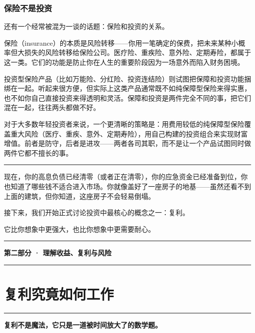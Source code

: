 \documentclass[a4paper,11pt,oneside,fontset=none,UTF8,zihao=-4]{ctexbook}
\newcommand{\partdivider}[1]{%
  \clearpage
  \thispagestyle{empty}%
  \vspace*{5.0cm}%
  \begin{center}%
    {\color{dh-blossom}\rule{0.35\textwidth}{1.5pt}\par}%
    \vspace{1.2cm}%
    {\Huge\bfseries\sffamily\color{dh-navy} #1\par}%
    \vspace{1.2cm}%
    {\color{dh-blossom}\rule{0.35\textwidth}{1.5pt}\par}%
  \end{center}%
  \vfill
  \clearpage
}
\begin{document}
\subsection{保险不是投资}\label{ux4fddux9669ux4e0dux662fux6295ux8d44}

还有一个经常被混为一谈的话题：保险和投资的关系。

保险（insurance）的本质是风险转移------你用一笔确定的保费，把未来某种小概率但大损失的风险转移给保险公司。医疗险、重疾险、意外险、定期寿险，都属于这一类。它们的功能是防止你在人生的重要阶段因为一场意外而陷入财务困境。

投资型保险产品（比如万能险、分红险、投资连结险）则试图把保障和投资功能捆绑在一起。听起来很方便，但实际上这类产品通常既不如纯保障型保险来得实惠，也不如你自己直接投资来得透明和灵活。保障和投资是两件完全不同的事，把它们混在一起，往往两头都做不好。

对于大多数年轻投资者来说，一个更清晰的策略是：用费用较低的纯保障型保险覆盖重大风险（医疗、重疾、意外、定期寿险），用自己构建的投资组合来实现财富增值。前者是防守，后者是进攻------两者各司其职，而不是让一个产品试图同时做两件它都不擅长的事。

\begin{center}{\color{dh-bronze}\rule{0.2\textwidth}{0.5pt}}\end{center}

现在，你的高息负债已经清零（或者正在清零），你的应急资金已经准备到位，你也知道了哪些钱不适合进入市场。你就像盖好了一座房子的地基------虽然还看不到上面的建筑，但你知道，这座房子不会轻易倒塌。

接下来，我们开始正式讨论投资中最核心的概念之一：复利。

它比你想象中更强大，也比你想象中更需要耐心。

\partdivider{第二部分 · 理解收益、复利与风险}

\newpage

\chapter{复利究竟如何工作}\label{ux590dux5229ux7a76ux7adfux5982ux4f55ux5de5ux4f5c}

\begin{center}{\color{dh-bronze}\rule{0.2\textwidth}{0.5pt}}\end{center}

\begin{dhquote}
\textbf{复利不是魔法，它只是一道被时间放大了的数学题。}
\end{dhquote}
\end{document}
